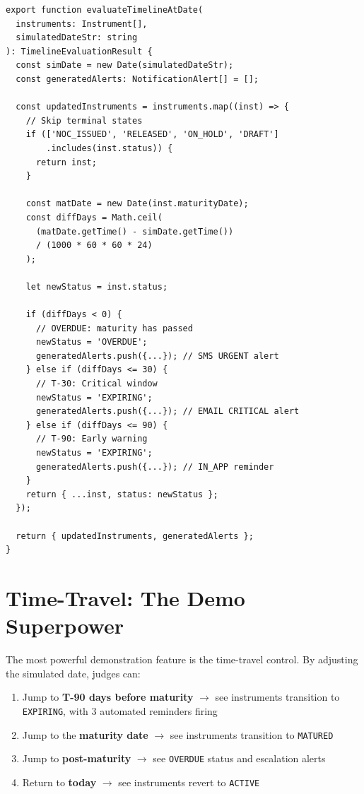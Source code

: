 \documentclass[12pt, a4paper]{report}
\begin{document}
\begin{lstlisting}[caption={Timeline Engine Core Logic (timelineEngine.ts)}, label={lst:timeline}]
export function evaluateTimelineAtDate(
  instruments: Instrument[],
  simulatedDateStr: string
): TimelineEvaluationResult {
  const simDate = new Date(simulatedDateStr);
  const generatedAlerts: NotificationAlert[] = [];

  const updatedInstruments = instruments.map((inst) => {
    // Skip terminal states
    if (['NOC_ISSUED', 'RELEASED', 'ON_HOLD', 'DRAFT']
        .includes(inst.status)) {
      return inst;
    }

    const matDate = new Date(inst.maturityDate);
    const diffDays = Math.ceil(
      (matDate.getTime() - simDate.getTime())
      / (1000 * 60 * 60 * 24)
    );

    let newStatus = inst.status;

    if (diffDays < 0) {
      // OVERDUE: maturity has passed
      newStatus = 'OVERDUE';
      generatedAlerts.push({...}); // SMS URGENT alert
    } else if (diffDays <= 30) {
      // T-30: Critical window
      newStatus = 'EXPIRING';
      generatedAlerts.push({...}); // EMAIL CRITICAL alert
    } else if (diffDays <= 90) {
      // T-90: Early warning
      newStatus = 'EXPIRING';
      generatedAlerts.push({...}); // IN_APP reminder
    }
    return { ...inst, status: newStatus };
  });

  return { updatedInstruments, generatedAlerts };
}
\end{lstlisting}

\section{Time-Travel: The Demo Superpower}

The most powerful demonstration feature is the time-travel control. By adjusting the simulated date, judges can:

\begin{enumerate}
  \item Jump to \textbf{T-90 days before maturity} $\rightarrow$ see instruments transition to \texttt{EXPIRING}, with 3 automated reminders firing
  \item Jump to the \textbf{maturity date} $\rightarrow$ see instruments transition to \texttt{MATURED}
  \item Jump to \textbf{post-maturity} $\rightarrow$ see \texttt{OVERDUE} status and escalation alerts
  \item Return to \textbf{today} $\rightarrow$ see instruments revert to \texttt{ACTIVE}
\end{enumerate}
\end{document}
